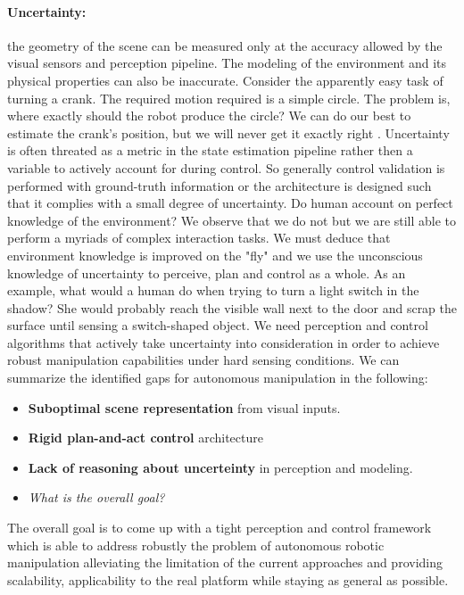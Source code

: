 \paragraph{Uncertainty: } the geometry of the scene can be measured only at the accuracy allowed by the visual sensors and perception pipeline. The modeling of the environment and its physical properties can also be inaccurate. Consider the apparently easy task of turning a crank. The required motion required is a simple circle. The problem is, where exactly should the robot produce the circle? We can do our best to estimate the crank’s position, but we will never get it exactly right \citep{mason2018toward}. Uncertainty is often threated as a metric in the state estimation pipeline rather then a variable to actively account for during control. So generally control validation is performed with ground-truth information or the architecture is designed such that it complies with a small degree of uncertainty. Do human account on perfect knowledge of the environment? We observe that we do not but we are still able to perform a myriads of complex interaction tasks. We must deduce that environment knowledge is improved on the "fly" and we use the unconscious knowledge of uncertainty to perceive, plan and control as a whole. As an example, what would a human do when trying to turn a light switch in the shadow? She would probably reach the visible wall next to the door and scrap the surface until sensing a switch-shaped object. We need perception and control algorithms that actively take uncertainty into consideration in order to achieve robust manipulation capabilities under hard sensing conditions.   
\newline
We can summarize the identified gaps for autonomous manipulation in the following:
\begin{itemize}
\item \textbf{Suboptimal scene representation} from visual inputs.
\item \textbf{Rigid plan-and-act control} architecture
\item \textbf{Lack of reasoning about uncerteinty} in perception and modeling. 
\end{itemize}

\begin{itemize}
    \item \emph{What is the overall goal?}
\end{itemize}

The overall goal is to come up with a tight perception and control framework which is able to address robustly the problem of autonomous robotic manipulation alleviating the limitation of the current approaches and providing scalability, applicability to the real platform while staying as general as possible.
